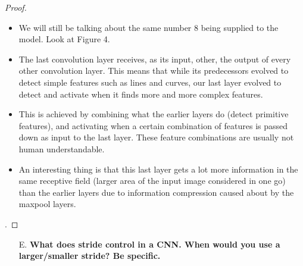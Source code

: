 \documentclass{article}
\theoremstyle{case}
\begin{document}
\begin{proof}
\begin{figure}[t]
            \end{figure}
            \begin{itemize}
                \item We will still be talking about the same number 8 being supplied to the model. Look at Figure 4.
                \item The last convolution layer receives, as its input, other, the output of every other convolution layer. This means that while its predecessors evolved to detect simple features such as lines and curves, our last layer evolved to detect and activate when it finds more and more complex features.
                \item This is achieved by combining what the earlier layers do (detect primitive features), and activating when a certain combination of features is passed down as input to the last layer. These feature combinations are usually not human understandable.
                \item An interesting thing is that this last layer gets a lot more information in the same receptive field (larger area of the input image considered in one go) than the earlier layers due to information compression caused about by the maxpool layers.
            \end{itemize}
. 
\end{proof}
\begin{enumerate}
    \item [E.] \textbf{What does stride control in a CNN. When would you use a larger/smaller
stride? Be specific.}
\end{enumerate} 
\end{document}
